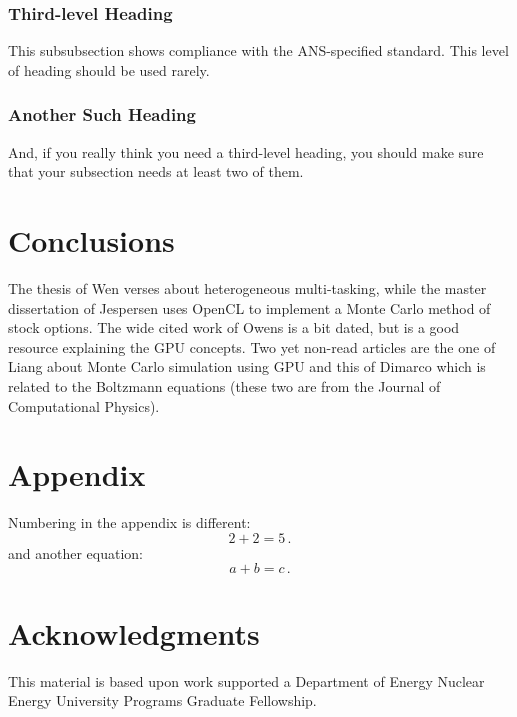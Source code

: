 \documentclass[twoside,a4paper,12pt,english]{anstrans}
\begin{document}
\subsubsection{Third-level Heading}
This subsubsection shows compliance with the ANS-specified standard. This level
of heading should be used rarely.

\subsubsection{Another Such Heading}
And, if you really think you need a third-level heading, you should make sure
that your subsection needs at least two of them.

\section{Conclusions}

The thesis of Wen \cite{Wen2017} verses about heterogeneous multi-tasking, while
the master dissertation of Jespersen \cite{Jespersen2015} uses OpenCL to implement
a Monte Carlo method of stock options. The wide cited work of Owens \cite{Owens2007}
is a bit dated, but is a good resource explaining the GPU concepts. Two yet non-read articles
are the one of Liang \cite{Liang2017} about Monte Carlo simulation using GPU and this of Dimarco
\cite{Dimarco2017} which is related to the Boltzmann equations (these two are from the Journal
of Computational Physics).

\appendix
\section{Appendix}

Numbering in the appendix is different:
\begin{equation} \label{eq:appendix}
  2 + 2 = 5\,.
\end{equation}
and another equation:
\begin{equation} \label{eq:appendix2}
  a + b = c\,.
\end{equation}

\section{Acknowledgments}
This material is based upon work supported a Department of Energy Nuclear
Energy University Programs Graduate Fellowship.
\end{document}
